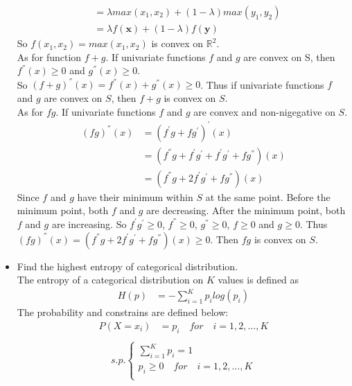 \documentclass{article}
\begin{document}
\begin{itemize}
\begin{align*}
    &= \lambda max(x_{1}, x_{2}) + (1 - \lambda) max(y_{1}, y_{2})\\
    &= \lambda f(\bm{x}) + (1 - \lambda)f(\bm{y})
\end{align*}
So $f(x_{1}, x_{2}) = max(x_{1}, x_{2})$ is convex on $\mathbb{R}^2$.\\
As for function $f + g$. If univariate functions $f$ and $g$ are convex on S, then $ f^{''}(x) \geq 0$ and $ g^{''}(x)\geq 0$.\\
So $(f + g)^{''}(x) = f^{''}(x) + g^{''}(x) \geq 0$. Thus if univariate functions $f$ and $g$ are convex on $S$, then $f + g$ is convex on $S$.\\
As for $fg$. If univariate functions $f$ and $g$ are convex and non-nigegative on $S$.
\begin{align*}
    (fg)^{''}(x) &= (f^{'}g + fg^{'})^{'}(x)\\
    &= (f^{''}g + f^{'}g^{'} + f^{'}g^{'} + fg^{''})(x)\\
    &= (f^{''}g + 2f^{'}g^{'} + f g^{''})(x)
\end{align*}
Since $f$ and $g$ have their minimum within $S$ at the same point. Before the minimum point, both $f$ and $g$ are decreasing. After the minimum point, both $f$ and $g$ are increasing. So $f^{'}g^{'} \geq 0$, $f^{''} \geq 0$, $g^{''} \geq 0$, $f\geq0$ and $g \geq 0$. Thus $(fg)^{''}(x) = (f^{''}g + 2f^{'}g^{'} + f g^{''})(x)\geq 0$. Then $fg$ is convex on $S$.\\
\item Find the highest entropy of categorical distribution.\\
The entropy of a categorical distribution on $K$ values is defined as\\
\begin{align*}
    H(p) &= -\sum_{i = 1}^K p_{i}log(p_{i})
\end{align*}
The probability and constrains are defined below:\\
\begin{align*}
    P(X = x_{i}) &= p_{i}\quad for\quad i = 1, 2, ..., K\\
\end{align*}
\begin{align*}
    s.p.\left\{
\begin{aligned}
\sum_{i = 1}^K p_{i} = 1\\
p_{i} \geq 0 \quad for\quad i = 1, 2, ..., K\\
\end{aligned}
\right.
\end{align*}

\end{itemize}
\end{document}

